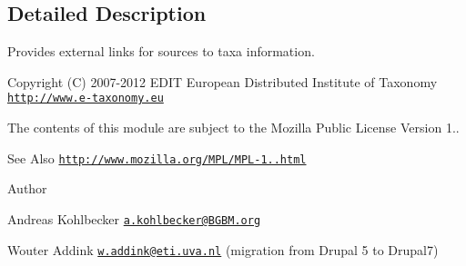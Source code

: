 \subsection{Detailed Description}
Provides external links for sources to taxa information.

\begin{DoxyCopyright}{Copyright}
(C) 2007-\/2012 E\-D\-I\-T European Distributed Institute of Taxonomy \href{http://www.e-taxonomy.eu}{\tt http\-://www.\-e-\/taxonomy.\-eu}
\end{DoxyCopyright}
The contents of this module are subject to the Mozilla Public License Version 1.. \begin{DoxySeeAlso}{See Also}
\href{http://www.mozilla.org/MPL/MPL-1.1.html}{\tt http\-://www.\-mozilla.\-org/\-M\-P\-L/\-M\-P\-L-\/1..\-html}
\end{DoxySeeAlso}
\begin{DoxyAuthor}{Author}

\begin{DoxyItemize}
\item Andreas Kohlbecker \href{mailto:a.kohlbecker@BGBM.org}{\tt a.\-kohlbecker@\-B\-G\-B\-M.\-org}
\item Wouter Addink \href{mailto:w.addink@eti.uva.nl}{\tt w.\-addink@eti.\-uva.\-nl} (migration from Drupal 5 to Drupal7) 
\end{DoxyItemize}
\end{DoxyAuthor}


